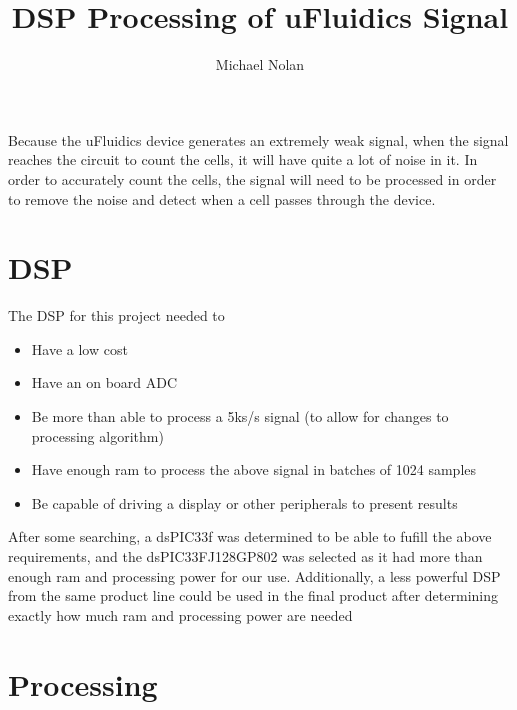 \documentclass[10pt, journal]{IEEEtran}
\title{DSP Processing of uFluidics Signal}
\author{Michael Nolan}
\begin{document}
\maketitle \par
Because the uFluidics device generates an extremely weak signal, when
the signal reaches the circuit to count the cells, it will have quite
a lot of noise in it. In order to accurately count the cells, the
signal will need to be processed in order to remove the noise and
detect when a cell passes through the device.

\section{DSP}
The DSP for this project needed to 
\begin{itemize}
\item Have a low cost
\item Have an on board ADC
\item Be more than able to process a 5ks/s signal (to allow for changes to processing algorithm)
\item Have enough ram to process the above signal in batches of 1024 samples
\item Be capable of driving a display or other peripherals to present results
\end{itemize}

After some searching, a dsPIC33f was determined to be able to fufill
the above requirements, and the dsPIC33FJ128GP802 was selected as it
had more than enough ram and processing power for our
use. Additionally, a less powerful DSP from the same product line
could be used in the final product after determining exactly how much
ram and processing power are needed

\section{Processing}
\end{document}
